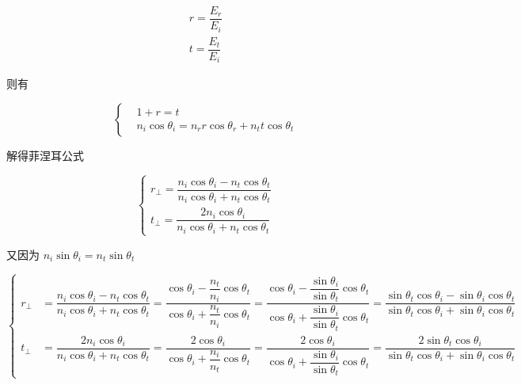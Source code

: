 \documentclass{article}
\begin{document}
\begin{equation*}
  \begin{aligned}
    r = \dfrac{E_r}{E_i} \\
    t = \dfrac{E_t}{E_i} 
  \end{aligned}
\end{equation*}

则有

\begin{equation*}
 \left\{
  \begin{aligned}
    & 1 + r = t \\
    & n_i \cos \theta_i = n_r r \cos \theta_r + n_t t \cos \theta_t
  \end{aligned}
  \right.
\end{equation*}

解得菲涅耳公式

\begin{equation*}
  \left\{
  \begin{aligned}
    r_{\perp} = \dfrac{n_i \cos \theta_i - n_t \cos \theta_t}{n_i \cos \theta_i + n_t \cos \theta_t} \\
    t_{\perp} = \dfrac{2 n_i \cos \theta_i}{n_i \cos \theta_i + n_t \cos \theta_t} 
  \end{aligned}
  \right.
\end{equation*}


又因为 $n_i \sin \theta_i = n_t \sin \theta_t$

\begin{equation*}
  \left\{
  \begin{aligned}
    r_{\perp} &= \dfrac{n_i \cos \theta_i - n_t \cos \theta_t}{n_i \cos \theta_i + n_t \cos \theta_t} = \dfrac{\cos \theta_i - \dfrac{n_t}{n_i}  \cos \theta_t}{\cos \theta_i + \dfrac{n_t}{n_i}  \cos \theta_t} = \dfrac{\cos \theta_i - \dfrac{\sin \theta_i}{\sin \theta_t}  \cos \theta_t}{\cos \theta_i + \dfrac{\sin \theta_i}{\sin \theta_t}  \cos \theta_t} = \dfrac{\sin \theta_t \cos \theta_i - \sin \theta_i \cos \theta_t}{\sin \theta_t \cos \theta_i + \sin \theta_i \cos \theta_t} \\
    t_{\perp} &= \dfrac{2 n_i \cos \theta_i}{n_i \cos \theta_i + n_t \cos \theta_t} = \dfrac{2 \cos \theta_i}{\cos \theta_i + \dfrac{n_i}{n_t}  \cos \theta_t} = \dfrac{2 \cos \theta_i}{\cos \theta_i + \dfrac{\sin \theta_i}{\sin \theta_t}  \cos \theta_t} = \dfrac{2 \sin \theta_t \cos \theta_i}{\sin \theta_t \cos \theta_i + \sin \theta_i \cos \theta_t}
  \end{aligned}
  \right.
\end{equation*}
\end{document}
